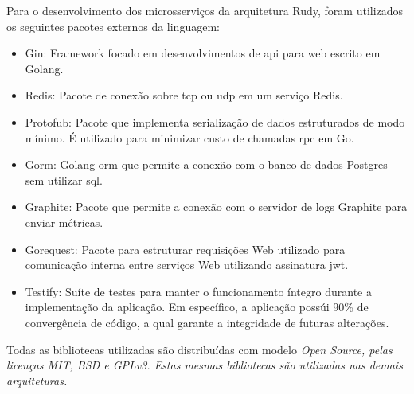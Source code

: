 Para o desenvolvimento dos microsserviços da arquitetura Rudy, foram utilizados os seguintes pacotes externos da linguagem:

\begin{itemize}
    \item Gin: Framework focado em desenvolvimentos de \ac{api} para web escrito em Golang.
    \item Redis: Pacote de conexão sobre \ac{tcp} ou \ac{udp} em um serviço Redis.
    \item Protofub: Pacote que implementa serialização de dados estruturados de modo mínimo. É utilizado para minimizar custo de chamadas \ac{rpc} em Go.
    \item Gorm: Golang \ac{orm} que permite a conexão com o banco de dados Postgres sem utilizar \ac{sql}.
    \item Graphite: Pacote que permite a conexão com o servidor de logs Graphite para enviar métricas.
    \item Gorequest: Pacote para estruturar requisições Web utilizado para comunicação interna entre serviços Web utilizando assinatura \ac{jwt}.
    \item Testify: Suíte de testes para manter o funcionamento íntegro durante a implementação da aplicação. Em específico, a aplicação possúi 90\% de convergência de código, a qual garante a integridade de futuras alterações.
\end{itemize}

Todas as bibliotecas utilizadas são distribuídas com modelo \it{Open Source}, pelas licenças \it{MIT}, \it{BSD} e \it{GPLv3}.
%
Estas mesmas bibliotecas são utilizadas nas demais arquiteturas.